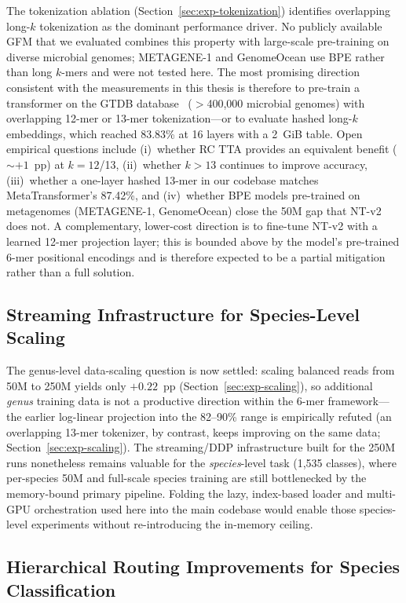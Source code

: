 The tokenization ablation (Section~\ref{sec:exp-tokenization}) identifies overlapping long-$k$ tokenization as the dominant performance driver. No publicly available GFM that we evaluated combines this property with large-scale pre-training on diverse microbial genomes; METAGENE-1 and GenomeOcean use BPE rather than long $k$-mers and were not tested here. The most promising direction consistent with the measurements in this thesis is therefore to pre-train a transformer on the GTDB database~\cite{Parks2022} ($>$400,000 microbial genomes) with overlapping 12-mer or 13-mer tokenization---or to evaluate hashed long-$k$ embeddings, which reached 83.83\% at 16 layers with a 2~GiB table. Open empirical questions include (i)~whether RC TTA provides an equivalent benefit ($\sim+1$~pp) at $k = 12$/13, (ii)~whether $k > 13$ continues to improve accuracy, (iii)~whether a one-layer hashed 13-mer in our codebase matches MetaTransformer's 87.42\%, and (iv)~whether BPE models pre-trained on metagenomes (METAGENE-1, GenomeOcean) close the 50M gap that NT-v2 does not. A complementary, lower-cost direction is to fine-tune NT-v2 with a learned 12-mer projection layer; this is bounded above by the model's pre-trained 6-mer positional encodings and is therefore expected to be a partial mitigation rather than a full solution.

\subsection{Streaming Infrastructure for Species-Level Scaling}

The genus-level data-scaling question is now settled: scaling balanced reads from 50M to 250M yields only $+0.22$~pp (Section~\ref{sec:exp-scaling}), so additional \emph{genus} training data is not a productive direction within the 6-mer framework---the earlier log-linear projection into the 82--90\% range is empirically refuted (an overlapping 13-mer tokenizer, by contrast, keeps improving on the same data; Section~\ref{sec:exp-scaling}). The streaming/DDP infrastructure built for the 250M runs nonetheless remains valuable for the \emph{species}-level task (1{,}535 classes), where per-species 50M and full-scale species training are still bottlenecked by the memory-bound primary pipeline. Folding the lazy, index-based loader and multi-GPU orchestration used here into the main codebase would enable those species-level experiments without re-introducing the in-memory ceiling.

\subsection{Hierarchical Routing Improvements for Species Classification}

